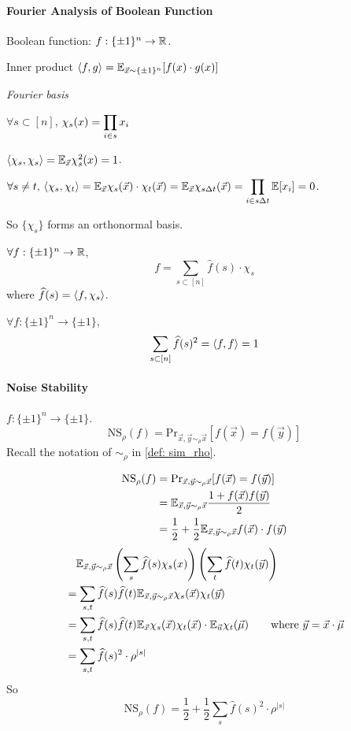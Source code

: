 \paragraph{Fourier Analysis of Boolean Function}
Boolean function:  $ f:\{\pm 1\}^n\rightarrow \mathbb R $.

Inner product  $ \left<f,g\right>=\mathbb E_{\vec{x}\sim \{\pm 1\}^n}[f(x)\cdot g(x)] $ 

\textit{Fourier basis}  

$ \forall s\subset [n] $,  $ \chi_s(x)=\displaystyle\prod_{i\in s}x_i $  

$ \left<\chi_s,\chi_s\right>=\mathbb E_{\vec{x}}\chi_s^2(x)=1 $.

$ \displaystyle\forall s\neq t, \,\left<\chi_s,\chi_t\right>=\mathbb E_{\vec{x}}\chi_s(\vec{x})\cdot\chi_t(\vec{x})=\mathbb E_{\vec{x}}\chi_{s\Delta t}(\vec{x})=\prod_{i\in s\Delta t}\mathbb E[x_i]=0 $.

So  $ \{\chi_s\} $ forms an orthonormal basis.

\begin{proposition}
    $ \forall f:\{\pm 1\}^n\rightarrow \mathbb R $, 
    \[f=\sum_{s\subset [n]}\hat{f}(s)\cdot\chi_s\] 
    where  $ \widehat{f}(s)=\left<f,\chi_s\right> $. 
\end{proposition}

\begin{theorem}[Parseval's]
    $ \forall f: \{\pm 1\}^n\rightarrow \{\pm 1\}$,
    \[\sum_{s\subset [n]}\widehat{f}(s)^2=\left<f,f\right>=1\] 
\end{theorem}
\paragraph{Noise Stability}
 $ f:\{\pm 1\}^n\rightarrow \{\pm 1 \} $.
 \[\mathrm{NS}_\rho(f)=\mathrm{Pr}_{\vec{x},\vec{y}\sim_\rho \vec{x}}[f(\vec{x})=f(\vec{y})]\]
Recall the notation of  $ \sim_\rho $ in  \eqref{def: sim_rho}.

\[\begin{aligned}
    \mathrm{NS}_\rho(f)&=\mathrm{Pr}_{\vec{x},\vec{y}\sim_\rho \vec{x}}[f(\vec{x})=f(\vec{y})]\\
    &=\mathbb E_{\vec{x},\vec{y}\sim_\rho \vec{x}}\frac{1+f(\vec{x})f(\vec{y})}{2}\\
    &=\frac{1}{2}+\frac{1}{2}\mathbb E_{\vec{x},\vec{y}\sim_\rho\vec{x}}f(\vec{x})\cdot f(\vec{y})
\end{aligned}\]
\[\begin{aligned}
    &\quad\mathbb E_{\vec{x},\vec{y}\sim_\rho\vec{x}}\left(\sum_{s}\widehat{f}(s)\chi_s(x)\right)\left(\sum_t\widehat{f}(t)\chi_t(\vec{y})\right)\\
    &=\sum_{s,t}\widehat{f}(s)\widehat{f}(t)\mathbb E_{\vec{x},\vec{y}\sim_\rho\vec{x}}\chi_s(\vec{x})\chi_t(\vec{y})\\
    &=\sum_{s,t}\widehat{f}(s)\widehat{f}(t)\mathbb E_{\vec{x}}\chi_s(\vec{x})\chi_t(\vec{x})\cdot\mathbb E_{\vec{u}}\chi_t(\vec{\mu})\qquad\text{where  $ \vec{y}=\vec{x}\cdot \vec{\mu} $}\\
    &=\sum_{s,t}\widehat{f}(s)^2\cdot\rho^{|s|}
\end{aligned}\]
So 
\[\mathrm{NS}_\rho(f)=\frac{1}{2}+\frac{1}{2}\sum_s\hat{f}(s)^2\cdot \rho^{|s|}\]